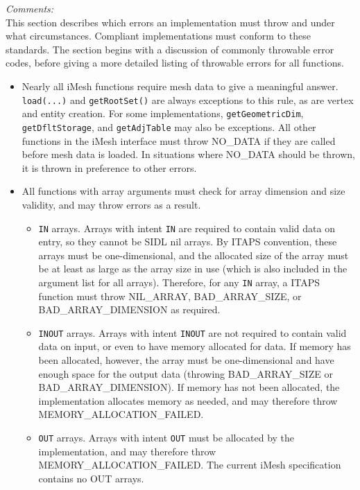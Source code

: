 \documentclass{article}
\begin{document}
\emph{C}\emph{omments:}\\

This section describes which errors an implementation must throw 
and under what circumstances. Compliant implementations must 
conform to these standards. The section begins with a discussion 
of commonly throwable error codes, before giving a more detailed 
listing of throwable errors for all functions.

\begin{itemize}
\item Nearly all iMesh functions require mesh data to give a meaningful 
answer. {\tt load(...)} and {\tt getRootSet()} are always exceptions to this 
rule, as are vertex and entity creation. For some implementations,
{\tt getGeometricDim}, 
{\tt getDfltStorage}, and {\tt getAdjTable} may also be exceptions. All other 
functions in the iMesh interface must throw NO\_DATA if they 
are called before mesh data is loaded. In situations where NO\_DATA 
should be thrown, it is thrown in preference to other errors.
  
\item All functions with array arguments must check for array dimension 
and size validity, and may throw errors as a result.

  \begin{itemize}
  \item {\tt IN} arrays. Arrays with intent {\tt IN} are required to contain valid 
  data on entry, so they cannot be SIDL nil arrays. By ITAPS convention, 
  these arrays must be one-dimensional, and the allocated size 
  of the array must be at least as large as the array size in use 
  (which is also included in the argument list for all arrays). 
  Therefore, for any {\tt IN} array, a ITAPS function must throw NIL\_ARRAY, 
  BAD\_ARRAY\_SIZE, or BAD\_ARRAY\_DIMENSION as required.
  \item {\tt INOUT} arrays. Arrays with intent {\tt INOUT} are not required to contain 
  valid data on input, or even to have memory allocated for data. 
  If memory has been allocated, however, the array must be one-dimensional 
  and have enough space for the output data (throwing BAD\_ARRAY\_SIZE 
  or BAD\_ARRAY\_DIMENSION). If memory has not been allocated, the 
  implementation allocates memory as needed, and may therefore 
  throw MEMORY\_ALLOCATION\_FAILED.
  \item {\tt OUT} arrays. Arrays with intent {\tt OUT} must be allocated by the implementation, 
  and may therefore throw MEMORY\_ALLOCATION\_FAILED. The current 
  iMesh specification contains no OUT arrays.
  \end{itemize}


\end{itemize}
\end{document}
